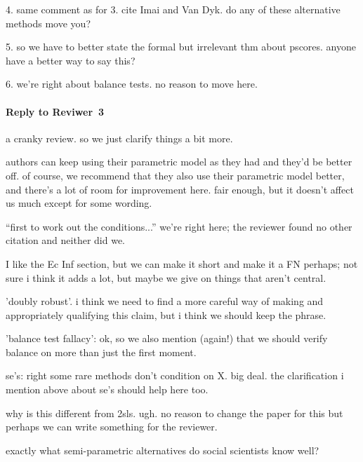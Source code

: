 \documentclass[11pt]{article}
\begin{document}
4.  same comment as for 3.  cite Imai and Van Dyk.  do any of these
alternative methods move you?

5. so we have to better state the formal but irrelevant thm about
pscores.  anyone have a better way to say this?

6.  we're right about balance tests.  no reason to move here.

\paragraph{Reply to Reviwer~3}

a cranky review.  so we just clarify things a bit more.

authors can keep using their parametric model as they had and they'd
be better off.  of course, we recommend that they also use their
parametric model better, and there's a lot of room for improvement
here.  fair enough, but it doesn't affect us much except for some
wording.

``first to work out the conditions...''  we're right here; the
reviewer found no other citation and neither did we.

I like the Ec Inf section, but we can make it short and make it a FN
perhaps; not sure i think it adds a lot, but maybe we give on things
that aren't central.

'doubly robust'.  i think we need to find a more careful way of making
and appropriately qualifying this claim, but i think we should keep
the phrase.
 
'balance test fallacy':  ok, so we also mention (again!) that we
should verify balance on more than just the first moment.

se's:  right some rare methods don't condition on X.  big deal.  the
clarification i mention above about se's should help here too.

why is this different from 2sls.  ugh.  no reason to change the paper
for this but perhaps we can write something for the reviewer.

exactly what semi-parametric alternatives do social scientists know
well?  
\end{document}
